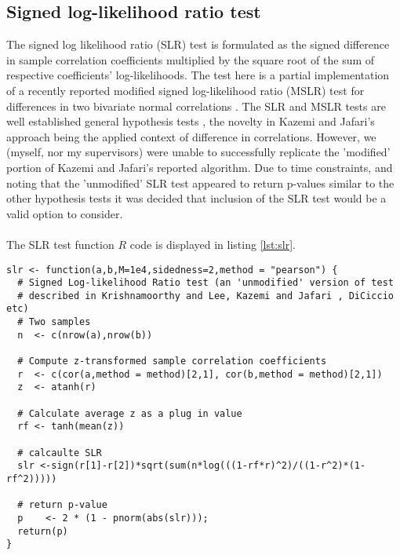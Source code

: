 \subsection{Signed log-likelihood ratio test}
The signed log likelihood ratio (SLR) test is formulated as the signed difference in sample correlation coefficients multiplied by the square root of the sum of respective coefficients' log-likelihoods.  The test here is a partial implementation of a recently reported modified signed log-likelihood ratio (MSLR) test  for differences in two bivariate normal correlations \cite{Kazemi2016}. The SLR and MSLR tests are well established general hypothesis tests \cite{Barndorff1986,Barndorff1991,Diciccio2001,Krishnamoorthy2014}, the novelty in Kazemi and Jafari's approach being the applied context of difference in correlations. However, we (myself, nor my supervisors) were unable to successfully replicate the 'modified' portion of Kazemi and Jafari's reported algorithm.  Due to time constraints, and noting that the 'unmodified' SLR test appeared to return p-values similar to the other hypothesis tests it was decided that inclusion of the SLR test would be a valid option to consider.
\\
\\
The SLR test function $R$ code is displayed in listing \ref{lst:slr}.

\begin{lstlisting}[float=h,caption={Signed log-likelihood ratio test},label={lst:slr}]
slr <- function(a,b,M=1e4,sidedness=2,method = "pearson") {
  # Signed Log-likelihood Ratio test (an 'unmodified' version of test 
  # described in Krishnamoorthy and Lee, Kazemi and Jafari , DiCiccio etc)
  # Two samples
  n  <- c(nrow(a),nrow(b))
  
  # Compute z-transformed sample correlation coefficients
  r  <- c(cor(a,method = method)[2,1], cor(b,method = method)[2,1])
  z  <- atanh(r)
  
  # Calculate average z as a plug in value
  rf <- tanh(mean(z))
  
  # calcaulte SLR
  slr <-sign(r[1]-r[2])*sqrt(sum(n*log(((1-rf*r)^2)/((1-r^2)*(1-rf^2)))))
  
  # return p-value
  p    <- 2 * (1 - pnorm(abs(slr))); 
  return(p)
}
\end{lstlisting}

